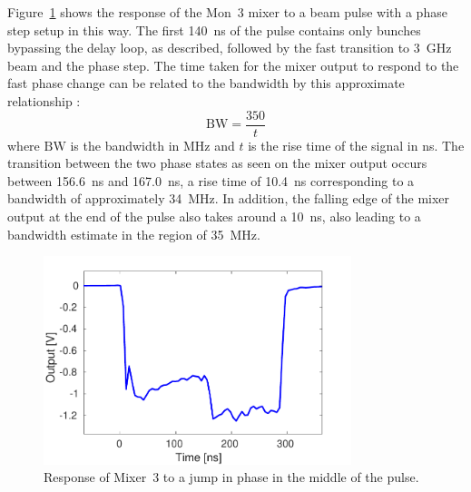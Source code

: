 Figure~\ref{f:bandwidthPlot} shows the response of the Mon~3 mixer to a beam pulse with a phase step setup in this way. The first 140~ns of the pulse contains only bunches bypassing the delay loop, as described, followed by the fast transition to 3~GHz beam and the phase step. The time taken for the mixer output to respond to the fast phase change can be related to the bandwidth by this approximate relationship \cite{bwRisTim}:
\begin{equation}
\mathrm{BW} = \frac{350}{t}
\end{equation}
where \(\mathrm{BW}\) is the bandwidth in MHz and \(t\) is the rise time of the signal in ns. The transition between the two phase states as seen on the mixer output occurs between 156.6~ns and 167.0~ns, a rise time of 10.4~ns corresponding to a bandwidth of approximately 34~MHz. In addition, the falling edge of the mixer output at the end of the pulse also takes around a 10~ns, also leading to a bandwidth estimate in the region of 35~MHz.

\begin{figure}
  \centering
  \includegraphics[width=0.8\textwidth]{Figures/phaseMons/bandwidthPlot}
  \caption{Response of Mixer~3 to a jump in phase in the middle of the pulse.}
  \label{f:bandwidthPlot}
\end{figure}

%



